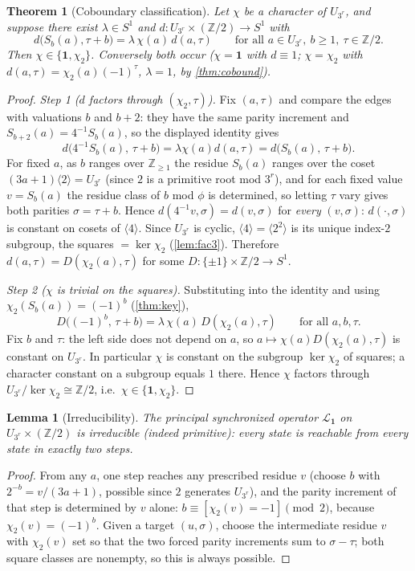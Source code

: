 \documentclass[11pt]{article}
\newcommand{\Z}{\mathbb{Z}}
\newcommand{\Lcal}{\mathcal{L}}
\newcommand{\UQ}{U_{3^r}}
\theoremstyle{plain}
\newtheorem{theorem}{Theorem}
\newtheorem{lemma}{Lemma}
\theoremstyle{definition}
\theoremstyle{remark}
\begin{document}
\begin{theorem}[Coboundary classification]\label{thm:class}
Let $\chi$ be a character of $\UQ$, and suppose there exist $\lambda\in S^1$ and
$d:\UQ\times(\Z/2)\to S^1$ with
\[
d\bigl(S_b(a),\tau+b\bigr)=\lambda\,\chi(a)\,d(a,\tau)
\qquad\text{for all }a\in\UQ,\ b\ge1,\ \tau\in\Z/2 .
\]
Then $\chi\in\{\mathbf1,\chi_2\}$. Conversely both occur ($\chi=\mathbf1$ with
$d\equiv1$; $\chi=\chi_2$ with $d(a,\tau)=\chi_2(a)(-1)^\tau$, $\lambda=1$, by
\cref{thm:cobound}).
\end{theorem}
\begin{proof}
\emph{Step 1 ($d$ factors through $(\chi_2,\tau)$).} Fix $(a,\tau)$ and compare
the edges with valuations $b$ and $b+2$: they have the same parity increment and
$S_{b+2}(a)=4^{-1}S_b(a)$, so the displayed identity gives
\[
d\bigl(4^{-1}S_b(a),\,\tau+b\bigr)=\lambda\chi(a)d(a,\tau)=d\bigl(S_b(a),\,\tau+b\bigr).
\]
For fixed $a$, as $b$ ranges over $\Z_{\ge1}$ the residue $S_b(a)$ ranges over the
coset $(3a+1)\langle2\rangle=\UQ$ (since $2$ is a primitive root mod $3^r$), and
for each fixed value $v=S_b(a)$ the residue class of $b$ mod $\phi$ is determined,
so letting $\tau$ vary gives both parities $\sigma=\tau+b$. Hence
$d(4^{-1}v,\sigma)=d(v,\sigma)$ for \emph{every} $(v,\sigma)$: $d(\cdot,\sigma)$
is constant on cosets of $\langle4\rangle$. Since $\UQ$ is cyclic,
$\langle4\rangle=\langle2^2\rangle$ is its unique index-$2$ subgroup, the squares
$=\ker\chi_2$ (\cref{lem:fac3}). Therefore $d(a,\tau)=D(\chi_2(a),\tau)$ for some
$D:\{\pm1\}\times\Z/2\to S^1$.

\emph{Step 2 ($\chi$ is trivial on the squares).} Substituting into the identity
and using $\chi_2(S_b(a))=(-1)^b$ (\cref{thm:key}),
\[
D\bigl((-1)^b,\,\tau+b\bigr)=\lambda\,\chi(a)\,D(\chi_2(a),\tau)
\qquad\text{for all }a,b,\tau .
\]
Fix $b$ and $\tau$: the left side does not depend on $a$, so
$a\mapsto\chi(a)D(\chi_2(a),\tau)$ is constant on $\UQ$. In particular $\chi$ is
constant on the subgroup $\ker\chi_2$ of squares; a character constant on a
subgroup equals $1$ there. Hence $\chi$ factors through
$\UQ/\ker\chi_2\cong\Z/2$, i.e.\ $\chi\in\{\mathbf1,\chi_2\}$.
\end{proof}

\begin{lemma}[Irreducibility]\label{lem:irred}
The principal synchronized operator $\Lcal_{\mathbf1}$ on $\UQ\times(\Z/2)$ is
irreducible (indeed primitive): every state is reachable from every state in
exactly two steps.
\end{lemma}
\begin{proof}
From any $a$, one step reaches any prescribed residue $v$ (choose $b$ with
$2^{-b}=v/(3a+1)$, possible since $2$ generates $\UQ$), and the parity increment
of that step is determined by $v$ alone: $b\equiv[\chi_2(v)=-1]\pmod 2$, because
$\chi_2(v)=(-1)^b$. Given a target $(u,\sigma)$, choose the intermediate residue
$v$ with $\chi_2(v)$ set so that the two forced parity increments sum to
$\sigma-\tau$; both square classes are nonempty, so this is always possible.
\end{proof}
\end{document}
